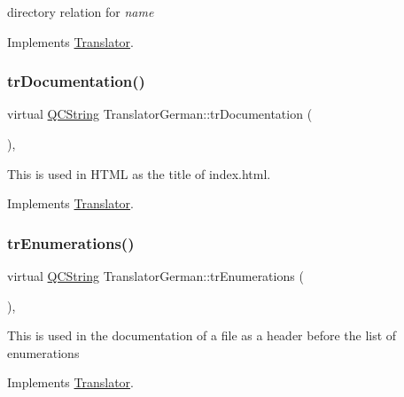 directory relation for {\itshape name} 

Implements \mbox{\hyperlink{class_translator}{Translator}}.

\mbox{\label{class_translator_german_af84a991adbc51bd61a87a66f832a2e0b}} 
\subsubsection{\texorpdfstring{trDocumentation()}{trDocumentation()}}
{\footnotesize\ttfamily virtual \mbox{\hyperlink{class_q_c_string}{Q\+C\+String}} Translator\+German\+::tr\+Documentation (\begin{DoxyParamCaption}{ }\end{DoxyParamCaption})\hspace{0.3cm}{\ttfamily [inline]}, {\ttfamily [virtual]}}

This is used in H\+T\+ML as the title of index.\+html. 

Implements \mbox{\hyperlink{class_translator}{Translator}}.

\mbox{\label{class_translator_german_a9a121a57ac4c7d263810bdca355ad500}} 
\subsubsection{\texorpdfstring{trEnumerations()}{trEnumerations()}}
{\footnotesize\ttfamily virtual \mbox{\hyperlink{class_q_c_string}{Q\+C\+String}} Translator\+German\+::tr\+Enumerations (\begin{DoxyParamCaption}{ }\end{DoxyParamCaption})\hspace{0.3cm}{\ttfamily [inline]}, {\ttfamily [virtual]}}

This is used in the documentation of a file as a header before the list of enumerations 

Implements \mbox{\hyperlink{class_translator}{Translator}}.

\mbox{\label{class_translator_german_a73b92dd184340ad39e264fcfa29f4299}} 

